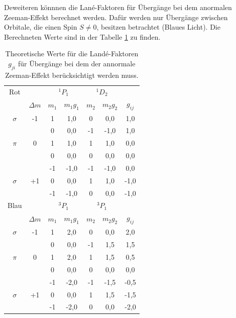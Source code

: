 Deweiteren könnnen die Lané-Faktoren für Übergänge
bei dem anormalen Zeeman-Effekt berechnet werden. Dafür werden nur
Übergänge zwischen Orbitale, die einen Spin $S\neq0$, besitzen betrachtet (Blaues Licht).
Die Berechneten Werte sind in der Tabelle \ref{tab:theo2}
zu finden.

\begin{table}
  \centering
  \caption{Theoretische Werte für die Landé-Faktoren $g_{ji}$ für Übergänge bei
  dem der annormale Zeeman-Effekt berücksichtigt werden muss.}
  \label{tab:theo2}
\begin{tabular}{c c c c c c c}
  \toprule
Rot      &            &  \multicolumn{2}{c}{$^1P_1$}  & \multicolumn{2}{c}{$^1D_2$} &    \\
      & $\Delta m$ &   $m_1$&  $m_1g_1$            & $m_2$    & $m_2g_2$         & $g_{ij}$\\
\midrule
$\sigma$ &  -1   &    1 &  1,0     &  0  & 0,0  &  1,0  \\
       &       &    0 &  0,0     & -1  & -1,0  &  1,0  \\
$\pi$    &   0   &    1 &  1,0     &  1  &  1,0  &  0,0  \\
       &       &    0 &  0,0     &  0  & 0,0  &  0,0  \\
       &       &   -1 & -1,0     & -1  & -1,0 &  0,0 \\
$\sigma$ &  +1   &    0 &  0,0     &  1  & 1,0  & -1,0  \\
       &       &   -1 & -1,0     &  0  & 0,0  & -1,0  \\
\midrule
\midrule
Blau &            &  \multicolumn{2}{c}{$^3P_1$}  & \multicolumn{2}{c}{$^3P_1$} &    \\
& $\Delta m$ &   $m_1$&  $m_1g_1$            & $m_2$    & $m_2g_2$         & $g_{ij}$\\
  \midrule
$\sigma$ &  -1   &    1 &  2,0     &  0  & 0,0  &  2,0  \\
       &       &    0 &  0,0     & -1  & 1,5  &  1,5  \\
$\pi $   &   0   &    1 &  2,0     &  1  & 1,5  &  0,5  \\
       &       &    0 &  0,0     &  0  & 0,0  &  0,0  \\
       &       &   -1 & -2,0     & -1  & -1,5 & -0,5  \\
$\sigma$ &  +1   &    0 &  0,0     &  1  & 1,5  & -1,5  \\
       &       &   -1 & -2,0     &  0  & 0,0  & -2,0  \\
\bottomrule
\end{tabular}
\end{table}


